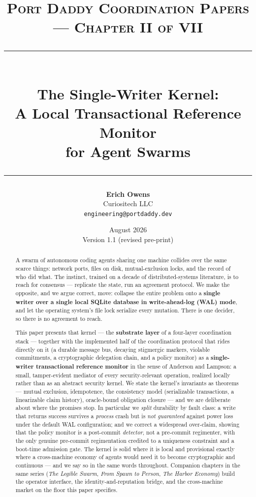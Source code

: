 \documentclass[11pt,a4paper]{article}
\title{
  \vspace{-1cm}
  {\Large\textsc{Port Daddy Coordination Papers --- Chapter II of VII}}\\[0.5cm]
  \rule{\textwidth}{0.5pt}\\[0.3cm]
  {\LARGE\textbf{The Single-Writer Kernel:}}\\[0.2cm]
  {\Large A Local Transactional Reference Monitor\\for Agent Swarms}\\[0.3cm]
  \rule{\textwidth}{0.5pt}
}
\author{
  \textbf{Erich Owens}\\[0.2cm]
  Curiositech LLC\\[0.2cm]
  \texttt{engineering@portdaddy.dev}
}
\date{August 2026\\Version 1.1 (revised pre-print)}
\theoremstyle{definition}
\theoremstyle{remark}
\begin{document}
\setlength{\emergencystretch}{2em}

\maketitle
\thispagestyle{empty}

\vspace{0.6cm}

\begin{abstract}\noindent
A swarm of autonomous coding agents sharing one machine collides over the same
scarce things: network ports, files on disk, mutual-exclusion locks, and the
record of who did what. The instinct, trained on a decade of distributed-systems
literature, is to reach for consensus --- replicate the state, run an agreement
protocol. We make the opposite, and we argue correct, move: collapse the entire
problem onto a \textbf{single writer over a single local SQLite database in
write-ahead-log (WAL) mode}, and let the operating system's file lock serialize
every mutation. There is one decider, so there is no agreement to reach.

This paper presents that kernel --- the \textbf{substrate layer} of a four-layer
coordination stack --- together with the implemented half of the coordination
protocol that rides directly on it (a durable message bus, decaying stigmergic
markers, violable commitments, a cryptographic delegation chain, and a policy
monitor) as a \textbf{single-writer transactional reference monitor} in the sense
of Anderson and Lampson: a small, tamper-evident mediator of every
security-relevant operation, realized locally rather than as an abstract security
kernel. We state the kernel's invariants as theorems --- mutual exclusion,
idempotence, the consistency model (serializable transactions, a linearizable
claim history), oracle-bound obligation closure --- and we are deliberate about
where the promises stop. In particular we \emph{split} durability by fault class:
a write that returns success survives a \emph{process} crash but is \emph{not
guaranteed} against power loss under the default WAL configuration; and we correct
a widespread over-claim, showing that the policy monitor is a post-commit
\emph{detector}, not a pre-commit regimenter, with the only genuine
pre-commit regimentation credited to a uniqueness constraint and a boot-time
admission gate. The kernel is solid where it is local and provisional exactly
where a cross-machine economy of agents would need it to become cryptographic and
continuous --- and we say so in the same words throughout. Companion chapters in the
same series (\emph{The Legible Swarm}, \emph{From Spawn to Person}, \emph{The
Harbor Economy}) build the operator interface, the identity-and-reputation bridge,
and the cross-machine market on the floor this paper specifies.
\end{abstract}
\end{document}
